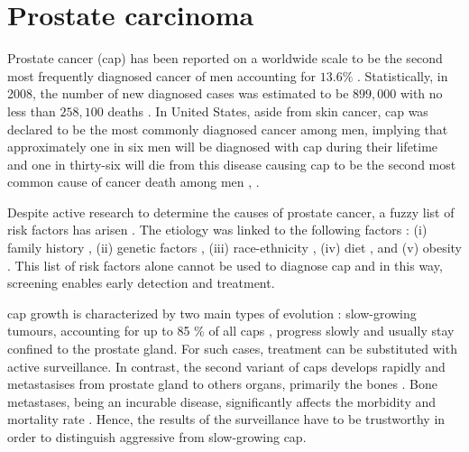
\section{Prostate carcinoma}
Prostate cancer (\acs{cap}) has been reported on a worldwide scale to be the second most frequently diagnosed cancer of men accounting for $13.6 \%$ \cite{Ferlay2010}.
Statistically, in 2008, the number of new diagnosed cases was estimated to be $899,000$ with no less than $258,100$ deaths \cite{Ferlay2010}.
In United States, aside from skin cancer, \ac{cap} was declared to be the most commonly diagnosed cancer among men, implying that approximately one in six men will be diagnosed with \ac{cap} during their lifetime and one in thirty-six will die from this disease causing \ac{cap} to be the second most common cause of cancer death among men \cite{Siegel2013}, \cite{Society2013}.

Despite active research to determine the causes of prostate cancer, a fuzzy list of risk factors has arisen \cite{Society2010}.
The etiology was linked to the following factors \cite{Society2010}: (i) family history \cite{Giovannucci2007,Steinberg1990}, (ii) genetic factors \cite{Freedman2006,Amundadottir2006,Agalliu2009}, (iii) race-ethnicity \cite{Giovannucci2007,Hoffman2001}, (iv) diet \cite{Giovannucci2007,Ma2009,Alexander2010}, and (v) obesity \cite{Giovannucci2007,Rodriguez2007}.
This list of risk factors alone cannot be used to diagnose \ac{cap} and in this way, screening enables early detection and treatment.

\ac{cap} growth is characterized by two main types of evolution \cite{Strum2005}: slow-growing tumours, accounting for up to 85 \% of all \acp{cap} \cite{Lu-Yao2009}, progress slowly and usually stay confined to the prostate gland.
For such cases, treatment can be substituted with active surveillance.
In contrast, the second variant of \acp{cap} develops rapidly and metastasises from prostate gland to others organs, primarily the bones \cite{Oster2013}.
Bone metastases, being an incurable disease, significantly affects the morbidity and mortality rate \cite{Ye2007}.
Hence, the results of the surveillance have to be trustworthy in order to distinguish aggressive from slow-growing \ac{cap}.

